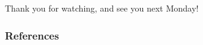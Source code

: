 \documentclass[12pt,english,dvipsnames,aspectratio=169,handout]{beamer}\usepackage[]{graphicx}\usepackage[]{xcolor}
\begin{document}
\begin{frame}
\begin{center}
    \LARGE Thank you for watching, and see you next Monday!
\end{center}
\end{frame}


\begin{frame}[allowframebreaks]
\frametitle{References}

\scriptsize
\end{frame}
\end{document}

